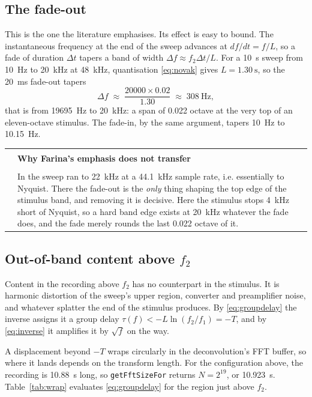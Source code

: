 \documentclass[11pt,a4paper]{article}
\makeatletter
\newcommand{\code}[1]{\texttt{\small #1}}
\newenvironment{remark}[1]
  {\par\medskip\noindent\begin{tabular}{@{}p{0.03\textwidth}p{0.93\textwidth}@{}}
   \textcolor{smtblue}{\rule{2pt}{\baselineskip}} & \textbf{#1}\\[2pt] & \ignorespaces}
  {\end{tabular}\par\medskip}
\makeatother
\begin{document}
\subsection{The fade-out}

This is the one the literature emphasises. Its effect is easy to bound. The
instantaneous frequency at the end of the sweep advances at
$df/dt = f/L$, so a fade of duration $\Delta t$ tapers a band of width
$\Delta f \approx f_2 \Delta t / L$. For a \SI{10}{\second} sweep from
\SI{10}{\hertz} to \SI{20}{\kilo\hertz} at \SI{48}{\kilo\hertz}, quantisation
\eqref{eq:novak} gives $L = \SI{1.30}{\second}$, so the
\SI{20}{\milli\second} fade-out tapers
%
\begin{equation}
  \Delta f \;\approx\; \frac{20000 \times 0.02}{1.30} \;\approx\; \SI{308}{\hertz},
\end{equation}
%
that is from \SI{19695}{\hertz} to \SI{20}{\kilo\hertz}: a span of
\num{0.022} octave at the very top of an eleven-octave stimulus. The fade-in,
by the same argument, tapers \SI{10}{\hertz} to \SI{10.15}{\hertz}.

\begin{remark}{Why Farina's emphasis does not transfer}
In \cite{Farina2007} the sweep ran to \SI{22}{\kilo\hertz} at a
\SI{44.1}{\kilo\hertz} sample rate, i.e. essentially to Nyquist. There the
fade-out is the \emph{only} thing shaping the top edge of the stimulus band, and
removing it is decisive. Here the stimulus stops \SI{4}{\kilo\hertz} short of
Nyquist, so a hard band edge exists at \SI{20}{\kilo\hertz} whatever the fade
does, and the fade merely rounds the last \num{0.022} octave of it.
\end{remark}

\subsection{Out-of-band content above $f_2$}
\label{sec:outofband}

Content in the recording above $f_2$ has no counterpart in the stimulus. It is
harmonic distortion of the sweep's upper region, converter and preamplifier
noise, and whatever splatter the end of the stimulus produces. By
\eqref{eq:groupdelay} the inverse assigns it a group delay
$\tau(f) < -L\ln(f_2/f_1) = -T$, and by \eqref{eq:inverse} it amplifies it by
$\sqrt{f}$ on the way.

A displacement beyond $-T$ wraps circularly in the deconvolution's FFT buffer,
so where it lands depends on the transform length. For the configuration above,
the recording is \SI{10.88}{\second} long, so \code{getFftSizeFor} returns
$N = 2^{19}$, or \SI{10.923}{\second}. Table~\ref{tab:wrap} evaluates
\eqref{eq:groupdelay} for the region just above $f_2$.
\end{document}
